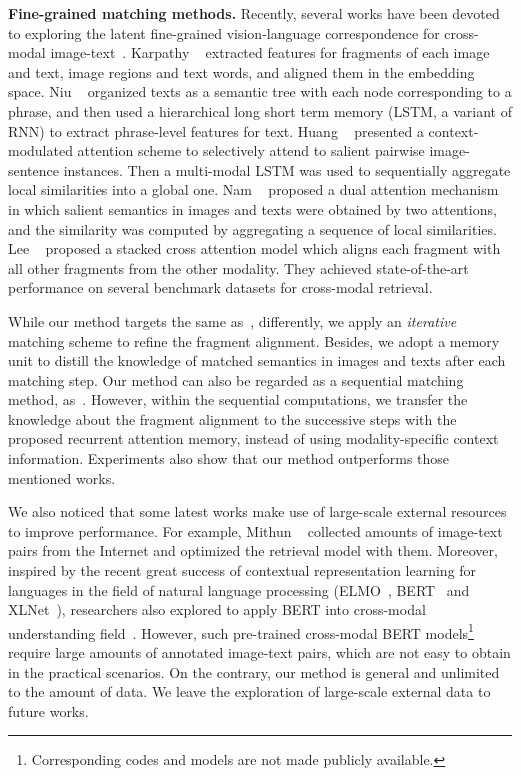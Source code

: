 \documentclass[10pt,twocolumn,letterpaper]{article}
\begin{document}
\textbf{Fine-grained matching methods.} Recently, several works have been devoted to exploring the latent fine-grained vision-language correspondence for cross-modal image-text~\cite{karpathy2015deep,Niu2017Hierarchical,huang2017instance,nam2017dual,lee2018stacked}. 
Karpathy \etal ~\cite{karpathy2015deep} extracted features for fragments of each image and text, \ie{} image regions and text words, and aligned them in the embedding space. Niu \etal{}~\cite{Niu2017Hierarchical} organized texts as a semantic tree with each node corresponding to a phrase, and then used a hierarchical long short term memory (LSTM, a variant of RNN) to extract phrase-level features for text. 
Huang \etal{}~\cite{huang2017instance} presented a context-modulated attention scheme to selectively attend to salient pairwise image-sentence instances. Then a multi-modal LSTM was used to sequentially aggregate local similarities into a global one. Nam \etal{}~\cite{nam2017dual} proposed a dual attention mechanism in which salient semantics in images and texts were obtained by two attentions, and the similarity was computed by aggregating a sequence of local similarities. Lee \etal{}~\cite{lee2018stacked} proposed a stacked cross attention model which aligns each fragment with all other fragments from the other modality. They achieved state-of-the-art performance on several benchmark datasets for cross-modal retrieval.

While our method targets the same as~\cite{karpathy2015deep,lee2018stacked}, differently, we apply an \textit{iterative} matching scheme to refine the fragment alignment. Besides, we adopt a memory unit to distill the knowledge of matched semantics in images and texts after each matching step. Our method can also be regarded as a sequential matching method, as~\cite{nam2017dual,huang2017instance}. However, within the sequential computations, we transfer the knowledge about the fragment alignment to the successive steps with the proposed recurrent attention memory, instead of using modality-specific context information. Experiments also show that our method outperforms those mentioned works.

We also noticed that some latest works make use of large-scale external resources to improve performance. For example, Mithun \etal{}~\cite{Mithun2018Webly} collected amounts of image-text pairs from the Internet and optimized the retrieval model with them. Moreover, inspired by the recent great success of contextual representation learning for languages in the field of natural language processing (ELMO~\cite{Peters2018ELMO}, BERT~\cite{devlin2018bert} and XLNet~\cite{yang2019xlnet}), researchers also explored to apply BERT into cross-modal understanding field~\cite{Chen2019UNITERLU,li2019unicodervl}. However, such pre-trained cross-modal BERT models\footnote{Corresponding codes and models are not made publicly available.} require large amounts of annotated image-text pairs, which are not easy to obtain in the practical scenarios. On the contrary, our method is general and unlimited to the amount of data. We leave the exploration of large-scale external data to future works.
\end{document}
